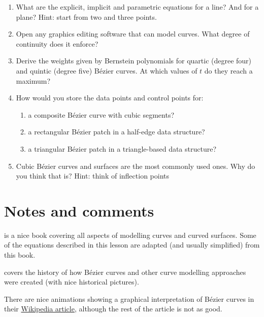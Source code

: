 \begin{enumerate}
	\item What are the explicit, implicit and parametric equations for a line? And for a plane? Hint: start from two and three points.
	\item Open any graphics editing software that can model curves. What degree of continuity does it enforce?
	\item Derive the weights given by Bernstein polynomials for quartic (degree four) and quintic (degree five) B\'ezier curves. At which values of \(t\) do they reach a maximum?
	\item How would you store the data points and control points for:
	\begin{enumerate}
		\item a composite B\'ezier curve with cubic segments?
		\item a rectangular B\'ezier patch in a half-edge data structure?
		\item a triangular B\'ezier patch in a triangle-based data structure?
	\end{enumerate}
	\item Cubic B\'ezier curves and surfaces are the most commonly used ones. Why do you think that is? Hint: think of inflection points
\end{enumerate}



%
\section{Notes and comments}

\citet{Salomon06} is a nice book covering all aspects of modelling curves and curved surfaces.
Some of the equations described in this lesson are adapted (and usually simplified) from this book.

\citet{Farin04} covers the history of how B\'ezier curves and other curve modelling approaches were created (with nice historical pictures).

There are nice animations showing a graphical interpretation of B\'ezier curves in their \href{https://en.wikipedia.org/wiki/Bézier_curve#Constructing_Bézier_curves}{Wikipedia article}, although the rest of the article is not as good.
